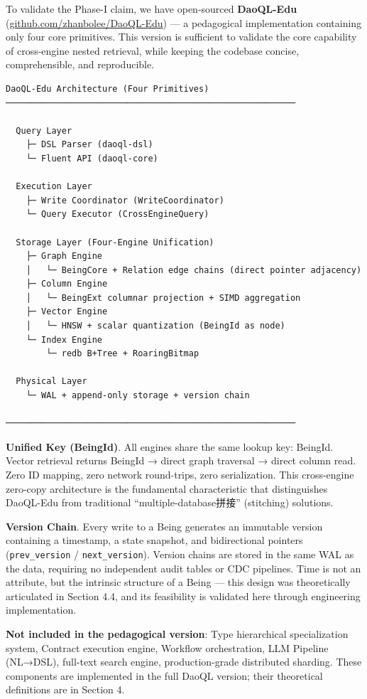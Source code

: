 \documentclass[11pt,a4paper]{article}
\begin{document}
To validate the Phase-I claim, we have open-sourced \textbf{DaoQL-Edu}
(\href{https://github.com/zhanbolee/DaoQL-Edu}{github.com/zhanbolee/DaoQL-Edu})
--- a pedagogical implementation containing only four core primitives.
This version is sufficient to validate the core capability of
cross-engine nested retrieval, while keeping the codebase concise,
comprehensible, and reproducible.

\begin{verbatim}
DaoQL-Edu Architecture (Four Primitives)
─────────────────────────────────────────────────────────

  Query Layer
    ├─ DSL Parser (daoql-dsl)
    └─ Fluent API (daoql-core)

  Execution Layer
    ├─ Write Coordinator (WriteCoordinator)
    └─ Query Executor (CrossEngineQuery)

  Storage Layer (Four-Engine Unification)
    ├─ Graph Engine
    │   └─ BeingCore + Relation edge chains (direct pointer adjacency)
    ├─ Column Engine
    │   └─ BeingExt columnar projection + SIMD aggregation
    ├─ Vector Engine
    │   └─ HNSW + scalar quantization (BeingId as node)
    └─ Index Engine
        └─ redb B+Tree + RoaringBitmap

  Physical Layer
    └─ WAL + append-only storage + version chain

─────────────────────────────────────────────────────────
\end{verbatim}

\textbf{Unified Key (BeingId)}. All engines share the same lookup key:
BeingId. Vector retrieval returns BeingId → direct graph traversal →
direct column read. Zero ID mapping, zero network round-trips, zero
serialization. This cross-engine zero-copy architecture is the
fundamental characteristic that distinguishes DaoQL-Edu from traditional
``multiple-database拼接'' (stitching) solutions.

\textbf{Version Chain}. Every write to a Being generates an immutable
version containing a timestamp, a state snapshot, and bidirectional
pointers (\texttt{prev\_version} / \texttt{next\_version}). Version
chains are stored in the same WAL as the data, requiring no independent
audit tables or CDC pipelines. Time is not an attribute, but the
intrinsic structure of a Being --- this design was theoretically
articulated in Section 4.4, and its feasibility is validated here
through engineering implementation.

\textbf{Not included in the pedagogical version}: Type hierarchical
specialization system, Contract execution engine, Workflow
orchestration, LLM Pipeline (NL→DSL), full-text search engine,
production-grade distributed sharding. These components are implemented
in the full DaoQL version; their theoretical definitions are in Section
4.
\end{document}
